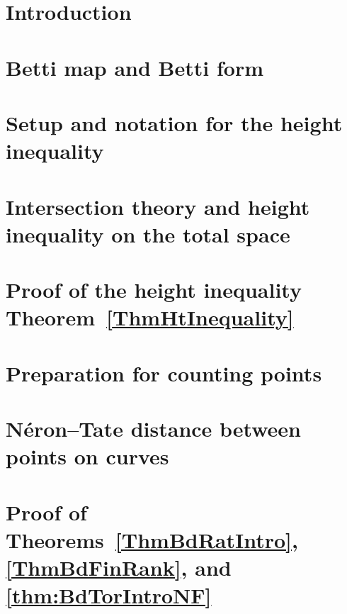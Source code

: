 \documentclass[12pt,oneside]{amsart}
\begin{document}
\tableofcontents

\section{Introduction}


\section{Betti map and Betti form}\label{SectionBettiRevisited}


\section{Setup and notation for the height inequality}\label{SectionSettingUpHtIneq}


\section{Intersection theory and height inequality on the total space}\label{SectionIntThAndHtIneq}


\section{Proof of the height inequality Theorem~\ref{ThmHtInequality}}\label{SectionHtIneq}


\section{Preparation for counting points}\label{SectionSettingUp}


\section{N\'{e}ron--Tate distance between points on curves}\label{SectionDistanceCurve}


\section{Proof of Theorems~\ref{ThmBdRatIntro}, \ref{ThmBdFinRank}, and \ref{thm:BdTorIntroNF}}\label{SectionRatPt}


%
\end{document}
